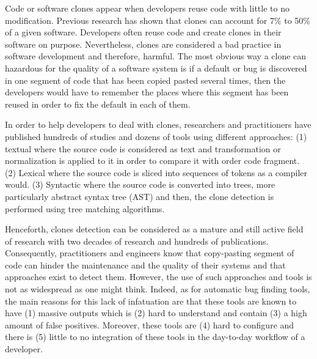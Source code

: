\documentclass[conference]{IEEEtran}
\begin{document}
Code or software clones appear when developers reuse code with little to no modification.
Previous research has shown that clones can account for 7\% to 50\% of a given software\cite{Baker, StephaneDucasse}.
Developers often reuse code and create clones in their software on purpose\cite{Kim2005}.
Nevertheless, clones are considered a bad practice in software development and therefore, harmful\cite{Kapser2006,Juergens2009,Li2006}.
The most obvious way a clone can hazardous for the quality of a software system is if a default or bug is discovered in one segment of code that has been copied pasted several times, then the developers would have to remember the places where this segment has been reused in order to fix the default in each of them.

In order to help developers to deal with clones, researchers and practitioners have published hundreds of studies and dozens of tools using different approaches:   (1) textual where the source code is considered as text and transformation or normalization is applied to it in order to compare it with order code fragment\cite{Johnson1994,Johnson1993, Cordy2011, Roy2008}.
(2) Lexical where the source code is sliced into sequences of tokens as a compiler would\cite{Baker,Bakera,Baker2002,Kamiya2002,Li2006}.
(3) Syntactic where the source code is converted into trees, more particularly abstract syntax tree (AST) and then, the clone detection is performed using tree matching algorithms\cite{Baxter1998, Komondoor2000, Tairas2006, Falke2008}.

Henceforth, clones detection can be considered as a mature and still active field of research with two decades of research and hundreds of publications.
Consequently, practitioners and engineers know that copy-pasting segment of code can hinder the maintenance and the quality of their systems and that approaches exist to detect them.
However, the use of such approaches and tools is not as widespread as one might think.
Indeed, as for automatic bug finding tools, the main reasons for this lack of infatuation are that these tools are known to have (1) massive outputs which is (2) hard to understand and contain (3) a high amount of false positives.
Moreover, these tools are (4) hard to configure and there is (5) little to no integration of these tools in the day-to-day workflow of a developer\cite{Johnson2013}.
\end{document}
